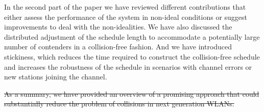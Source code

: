 \documentclass[journal]{IEEEtran}
\providecommand{\DIFdel}[1]{{\protect\color{red}\sout{#1}}}                      %
\providecommand{\DIFdelbegin}{} %
\providecommand{\DIFdelend}{} %
\begin{document}
In the second part of the paper we have reviewed different contributions that either assess the performance of the system in non-ideal conditions or suggest improvements to deal with the non-idealities.
We have also discussed the distributed adjustment of the schedule length to accommodate a potentially large number of contenders in a collision-free fashion.
And we have introduced stickiness, which reduces the time required to construct the collision-free schedule and increases the robustness of the schedule in scenarios with channel errors or new stations joining the channel.

\DIFdelbegin \DIFdel{As a summary, we have provided an overview of a promising approach that could substantially reduce the problem of collisions in next generation WLANs.
}\DIFdelend %



%
%



%
%
\end{document}
